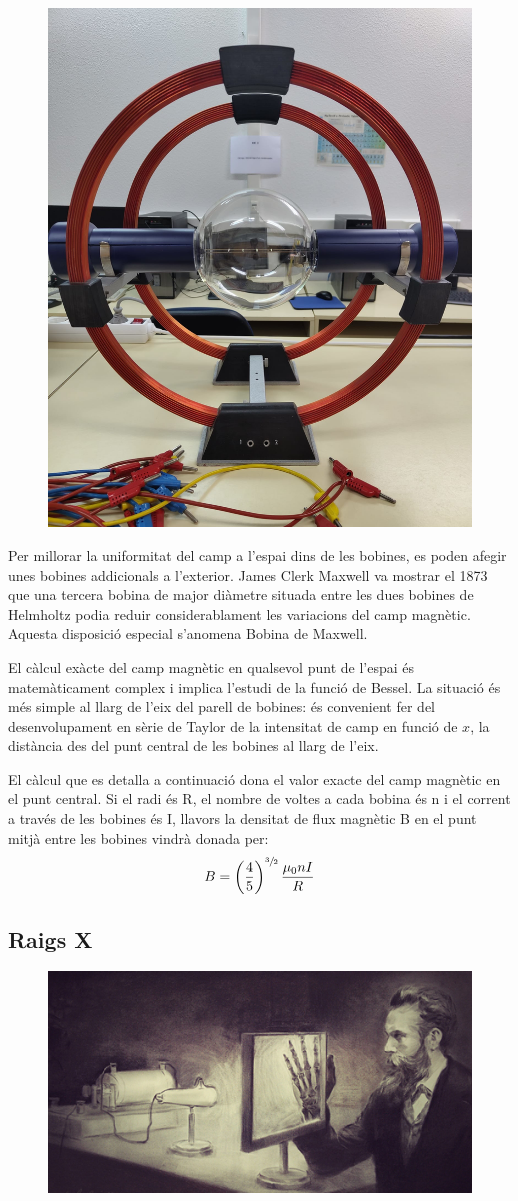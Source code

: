 \documentclass[11pt]{article}
\begin{document}
        \begin{figure}
            \vspace{-0.9cm}
            \begin{center}
                \includegraphics[width=.3\textwidth]{fotos/bobina.jpeg}
            \end{center}
        \end{figure}

        
        \vspace{0.4cm}Per millorar la uniformitat del camp a l'espai dins de les bobines, es poden afegir unes bobines addicionals a l'exterior. James Clerk Maxwell va mostrar el 1873 que una tercera bobina de major diàmetre situada entre les dues bobines de Helmholtz podia reduir considerablament les variacions del camp magnètic. Aquesta disposició especial s'anomena Bobina de Maxwell.

        \vspace{0.4cm}El càlcul exàcte del camp magnètic en qualsevol punt de l'espai és matemàticament complex i implica l'estudi de la funció de Bessel. La situació és més simple al llarg de l'eix del parell de bobines: és convenient fer del desenvolupament en sèrie de Taylor de la intensitat de camp en funció de $x$, la distància des del punt central de les bobines al llarg de l'eix. 

        \vspace{0.5cm}\hspace{-0cm}El càlcul que es detalla a continuació dona el valor exacte del camp magnètic en el punt central. Si el radi és R, el nombre de voltes a cada bobina és n i el corrent a través de les bobines és I, llavors la densitat de flux magnètic B en el punt mitjà entre les bobines vindrà donada per:
        \[B = \left(\frac45\right)^{\sfrac{3}{2}}\frac{\mu_0nI}{R}\]
        \clearpage
    \subsection{Raigs X}
        \begin{figure}
            \vspace{-0.9cm}
            \begin{center}
                \includegraphics[width=.31\textwidth]{fotos/rayosx.jpg}
            \end{center}
        \end{figure}
        
\end{document}
